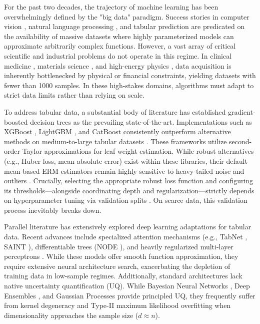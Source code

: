 \documentclass{article}
\begin{document}
For the past two decades, the trajectory of machine learning has been overwhelmingly defined by the "big data" paradigm. Success stories in computer vision \cite{krizhevsky2012imagenet, he2016deep}, natural language processing \cite{devlin2018bert, brown2020language}, and tabular prediction \cite{shwartz2022tabular} are predicated on the availability of massive datasets where highly parameterized models can approximate arbitrarily complex functions. However, a vast array of critical scientific and industrial problems do not operate in this regime. In clinical medicine \cite{warnat2021swarm, rajkomar2018scalable}, materials science \cite{ramprasad2017machine, schmidt2019recent}, and high-energy physics \cite{guest2018deep, radovic2018machine}, data acquisition is inherently bottlenecked by physical or financial constraints, yielding datasets with fewer than 1000 samples. In these high-stakes domains, algorithms must adapt to strict data limits rather than relying on scale.

To address tabular data, a substantial body of literature has established gradient-boosted decision trees as the prevailing state-of-the-art. Implementations such as XGBoost \cite{chen2016xgboost}, LightGBM \cite{ke2017lightgbm}, and CatBoost \cite{prokhorenkova2018catboost} consistently outperform alternative methods on medium-to-large tabular datasets \cite{grinsztajn2022tree, borisov2022deep}. These frameworks utilize second-order Taylor approximations for leaf weight estimation. While robust alternatives (e.g., Huber loss, mean absolute error) exist within these libraries, their default mean-based ERM estimators remain highly sensitive to heavy-tailed noise and outliers \cite{huber2004robust, hampel1986robust}. Crucially, selecting the appropriate robust loss function and configuring its thresholds—alongside coordinating depth and regularization—strictly depends on hyperparameter tuning via validation splits \cite{feurer2015efficient, bergstra2012random}. On scarce data, this validation process inevitably breaks down.

Parallel literature has extensively explored deep learning adaptations for tabular data. Recent advances include specialized attention mechanisms (e.g., TabNet \cite{arik2021tabnet}, SAINT \cite{somepalli2021saint}), differentiable trees (NODE \cite{popov2019neural}), and heavily regularized multi-layer perceptrons \cite{gorishniy2021revisiting, kadra2021well}. While these models offer smooth function approximation, they require extensive neural architecture search, exacerbating the depletion of training data in low-sample regimes. Additionally, standard architectures lack native uncertainty quantification (UQ). While Bayesian Neural Networks \cite{neal2012bayesian}, Deep Ensembles \cite{lakshminarayanan2017simple}, and Gaussian Processes \cite{williams2006gaussian} provide principled UQ, they frequently suffer from kernel degeneracy and Type-II maximum likelihood overfitting when dimensionality approaches the sample size ($d \approx n$).
\end{document}
